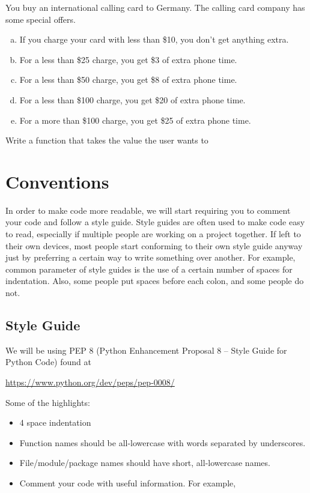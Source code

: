 \documentclass[11pt]{cselabheader}
\begin{document}
{\begin{ex}[calls.py] You buy an international calling card to Germany. The calling
    card company has some special offers.

    \begin{enumerate}[(a)]
      \item If you charge your card with less than \$10, you don't get anything
        extra.
      \item For a less than \$25 charge, you get \$3 of extra phone time.
      \item For a less than \$50 charge, you get \$8 of extra phone time.
      \item For a less than \$100 charge, you get \$20 of extra phone time.
      \item For a more than \$100 charge, you get \$25 of extra phone time.
    \end{enumerate}

    Write a function that takes the value the user wants to 
\end{ex}

\pagebreak
\section{Conventions}
\label{sec:pep8}

In order to make code more readable, we will start requiring you to comment your
code and follow a style guide. Style guides are often used to make code easy to
read, especially if multiple people are working on a project together. If left
to their own devices, most people start conforming to their own style guide
anyway just by preferring a certain way to write something over another. For
example, common parameter of style guides is the use of a certain number of
spaces for indentation. Also, some people put spaces before each colon, and some
people do not.

\subsection{Style Guide}

We will be using PEP 8 (Python Enhancement Proposal 8 -- Style Guide for Python
Code) found at
\begin{center}
  \url{https://www.python.org/dev/peps/pep-0008/}
\end{center}

Some of the highlights:
\begin{itemize}
  \item 4 space indentation
  \item Function names should be all-lowercase with words separated by underscores.
  \item File/module/package names should have short, all-lowercase names.
  \item Comment your code with useful information. For example,


\end{itemize}}
\end{document}

